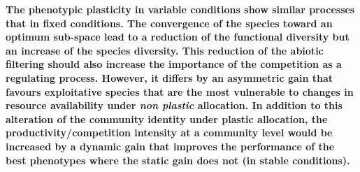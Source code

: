 
%

\textbf{The phenotypic plasticity in variable conditions show similar processes that in fixed conditions. The convergence of the species toward an optimum sub-space lead to a reduction of the functional diversity but an increase of the species diversity. This reduction of the abiotic filtering should also increase the importance of the competition as a regulating process. However, it differs by an asymmetric gain that favours exploitative species that are the most vulnerable to changes in resource availability under \textit{non plastic} allocation. In addition to this alteration of the community identity under plastic allocation, the productivity/competition intensity at a community level would be increased by a dynamic gain that improves the performance of the best phenotypes where the static gain does not (in stable conditions). }



